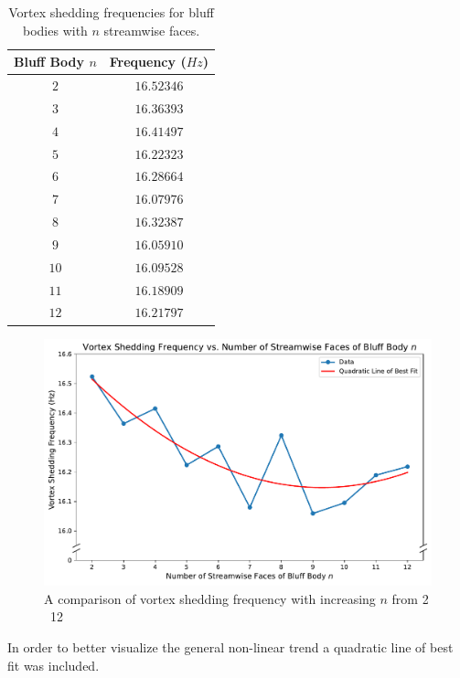 \begin{table}[H]
	\centering
	\renewcommand{\arraystretch}{1.3}
	\begin{tabular}{|c|c|}
		\hline
		\textbf{Bluff Body $n$} & \textbf{Frequency ($Hz$)} \\
		\hline
		$2$  & $16.52346$ \\
		$3$  & $16.36393$ \\
		$4$  & $16.41497$ \\
		$5$  & $16.22323$ \\
		$6$  & $16.28664$ \\
		$7$  & $16.07976$ \\
		$8$  & $16.32387$ \\
		$9$  & $16.05910$ \\
		$10$ & $16.09528$ \\
		$11$ & $16.18909$ \\
		$12$ & $16.21797$ \\
		\hline
	\end{tabular}
	\caption{Vortex shedding frequencies for bluff bodies with $n$ streamwise faces.}
	\label{tab:frequencyData}
\end{table}


\begin{figure}[H]
	\centering
	\includegraphics[width=\textwidth]{images/overall}
	\caption{A comparison of vortex shedding frequency with increasing $n$ from 2 \textendash\ 12}
	\label{fig:overall} 
\end{figure}

In order to better visualize the general non-linear trend a quadratic line of best fit was included. 


